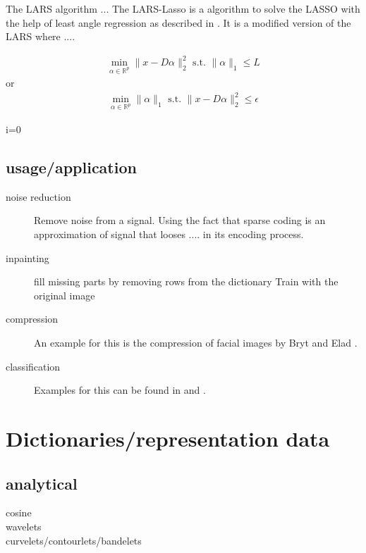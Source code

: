 The LARS algorithm ... \cite{Efron2004}
The LARS-Lasso is a algorithm to solve the LASSO with the help of least angle regression
as described in \cite{Efron2004}. It is a modified version of the LARS where ....

\begin{align}
\min_{\alpha\in\mathbb{R}^{p}}  \lVert x - D\alpha \rVert^{2}_{2} \textrm{ s.t. } \lVert \alpha \rVert_{1} \leq L
\end{align}
or
\begin{align}
\min_{\alpha\in\mathbb{R}^{p}}   \lVert \alpha \rVert_{1}   \textrm{ s.t. } \lVert x - D\alpha \rVert^{2}_{2} \leq \epsilon
\end{align}

\begin{algorithm}
\begin{algorithmic}
\STATE i=0
\end{algorithmic}
\end{algorithm}

\subsection{usage/application}
\begin{description}
\item[noise reduction]
Remove noise from a signal. Using the fact that sparse coding 
is an approximation of signal that looses .... in its encoding process. 
\cite{Elad2006}

\item[inpainting]
fill missing parts by removing rows from the dictionary
Train with the original image
\cite{mairal08sparse}

\item[compression] An example for this is the compression of facial images by Bryt and Elad \cite{Bryt2008}.
\item[classification] Examples for this can be found in \cite{Mairal2008b} and \cite{Bar2009}.
\end{description}



\section{Dictionaries/representation data}
\subsection{analytical}
\begin{description}
 \item[cosine]
 \item[wavelets]
 \item[curvelets/contourlets/bandelets]
\end{description}

